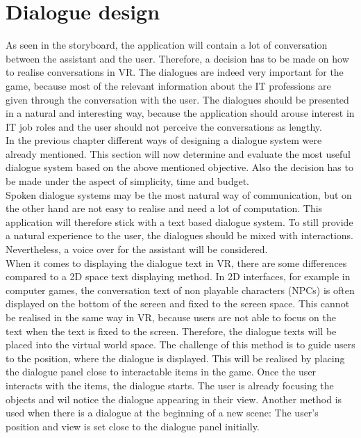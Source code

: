 \newpage
\section{Dialogue design}
As seen in the storyboard, the application will contain a lot of conversation between the assistant and the user. Therefore, a decision has to be made on how to realise conversations in VR. The dialogues are indeed very important for the game, because most of the relevant information about the IT professions are given through the conversation with the user. The dialogues should be presented in a natural and interesting way, because the application should arouse interest in IT job roles and the user should not perceive the conversations as lengthy.\\
In the previous chapter different ways of designing a dialogue system were already mentioned. This section will now determine and evaluate the most useful dialogue system based on the above mentioned objective. Also the decision has to be made under the aspect of simplicity, time and budget.\\
Spoken dialogue systems may be the most natural way of communication, but on the other hand are not easy to realise and need a lot of computation. This application will therefore stick with a text based dialogue system. To still provide a natural experience to the user, the dialogues should be mixed with interactions. Nevertheless, a voice over for the assistant will be considered. \\
When it comes to displaying the dialogue text in VR, there are some differences compared to a 2D space text displaying method. In 2D interfaces, for example in computer games, the conversation text of non playable characters (NPCs) is often displayed on the bottom of the screen and fixed to the screen space. This cannot be realised in the same way in VR, because users are not able to focus on the text when the text is fixed to the screen. Therefore, the dialogue texts will be placed into the virtual world space. The challenge of this method is to guide users to the position, where the dialogue is displayed. This will be realised by placing the dialogue panel close to interactable items in the game. Once the user interacts with the items, the dialogue starts. The user is already focusing the objects and wil notice the dialogue appearing in their view. Another method is used when there is a dialogue at the beginning of a new scene: The user's position and view is set close to the dialogue panel initially.
